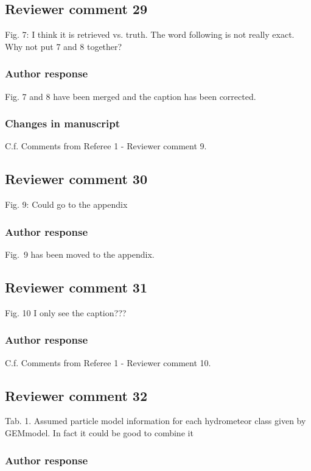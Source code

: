 \subsection*{Reviewer comment 29}
Fig. 7: I think it is retrieved vs. truth. The word following is not really
exact. Why not put 7 and 8 together?

\subsubsection*{Author response}

Fig. 7 and 8 have been merged and the caption has been corrected.

\subsubsection*{Changes in manuscript}

C.f. Comments from Referee 1 - Reviewer comment 9.

\subsection*{Reviewer comment 30}
Fig. 9: Could go to the appendix

\subsubsection{Author response}
Fig.~9 has been moved to the appendix.

\subsection*{Reviewer comment 31}
Fig. 10 I only see the caption???

\subsubsection*{Author response}


C.f. Comments from Referee 1 - Reviewer comment 10.

\subsection*{Reviewer comment 32}

Tab. 1. Assumed particle model information for each hydrometeor class given by
GEMmodel. In fact it could be good to combine it

\subsubsection*{Author response}

